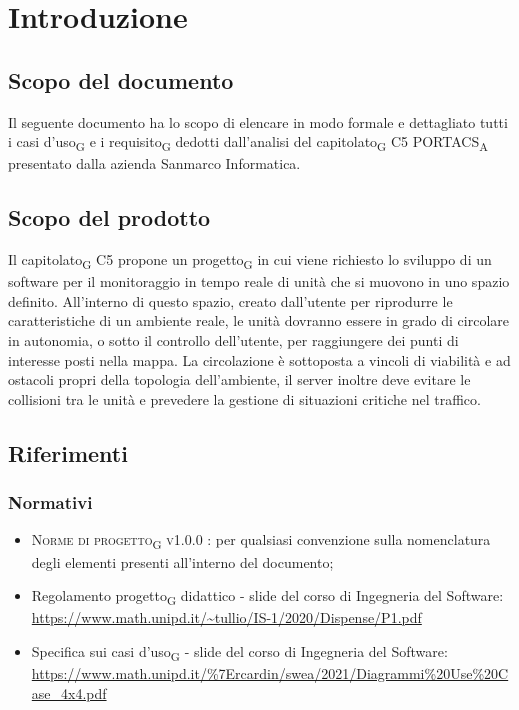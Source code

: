 \section{Introduzione}
\subsection{Scopo del documento}
Il seguente documento ha lo scopo di elencare in modo formale e dettagliato tutti i casi d'uso\textsubscript{G} e i requisito\textsubscript{G} dedotti dall'analisi del capitolato\textsubscript{G} C5 PORTACS\textsubscript{A} presentato dalla azienda Sanmarco Informatica.

\subsection{Scopo del prodotto}
Il capitolato\textsubscript{G} C5 propone un progetto\textsubscript{G} in cui viene richiesto lo sviluppo di un software per il monitoraggio in tempo reale di unità che si muovono in uno spazio definito. All'interno di questo spazio, creato dall'utente per riprodurre le caratteristiche di un ambiente reale, le unità dovranno essere in grado di circolare in autonomia, o sotto il controllo dell'utente, per raggiungere dei punti di interesse posti nella mappa. La circolazione è sottoposta a vincoli di viabilità e ad ostacoli propri della topologia dell'ambiente, il server inoltre deve evitare le collisioni tra le unità e prevedere la gestione di situazioni critiche nel traffico.

\subsection{Riferimenti}
\subsubsection{Normativi}
\begin{itemize}
\item \textsc{Norme di progetto\textsubscript{G} v1.0.0 }: per qualsiasi convenzione sulla nomenclatura degli elementi presenti all'interno del documento;
\item Regolamento progetto\textsubscript{G} didattico - slide del corso di Ingegneria del Software: \\ \url{https://www.math.unipd.it/~tullio/IS-1/2020/Dispense/P1.pdf}
\item Specifica sui casi d'uso\textsubscript{G} - slide del corso di Ingegneria del Software: \\ \url{https://www.math.unipd.it/\%7Ercardin/swea/2021/Diagrammi\%20Use\%20Case_4x4.pdf}
\end{itemize}
